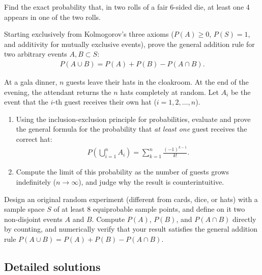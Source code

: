 \begin{problema}
	\label{prob:69a20ec}
	Find the exact probability that, in two rolls of a fair 6-sided die, at least one 4 appears in one of the two rolls.
\end{problema}

\begin{problema}
	\label{prob:1f335a1}
	Starting exclusively from Kolmogorov's three axioms ($P(A) \ge 0$, $P(S)=1$, and additivity for mutually exclusive events), prove the general addition rule for two arbitrary events $A, B \subset S$:
	\begin{align}
		P(A \cup B) = P(A) + P(B) - P(A \cap B).
	\end{align}
\end{problema}

\begin{problema}
	\label{prob:a4ff50c}
	At a gala dinner, $n$ guests leave their hats in the cloakroom. At the end of the evening, the attendant returns the $n$ hats completely at random. Let $A_{i}$ be the event that the $i$-th guest receives their own hat ($i=1,2,\dots,n$).
	\begin{enumerate}
		\item Using the inclusion-exclusion principle for probabilities, evaluate and prove the general formula for the probability that \emph{at least one} guest receives the correct hat:
		\begin{align}
			P\left( \bigcup_{i=1}^{n} A_{i} \right) = \sum_{k=1}^{n} \frac{(-1)^{k-1}}{k!}.
		\end{align}
		\item Compute the limit of this probability as the number of guests grows indefinitely ($n \to \infty$), and judge why the result is counterintuitive.
	\end{enumerate}
\end{problema}

\begin{problema}
	\label{prob:b993271}
	Design an original random experiment (different from cards, dice, or hats) with a sample space $S$ of at least 8 equiprobable sample points, and define on it two non-disjoint events $A$ and $B$. Compute $P(A)$, $P(B)$, and $P(A \cap B)$ directly by counting, and numerically verify that your result satisfies the general addition rule $P(A \cup B) = P(A) + P(B) - P(A \cap B)$.
\end{problema}

\subsection*{Detailed solutions}

